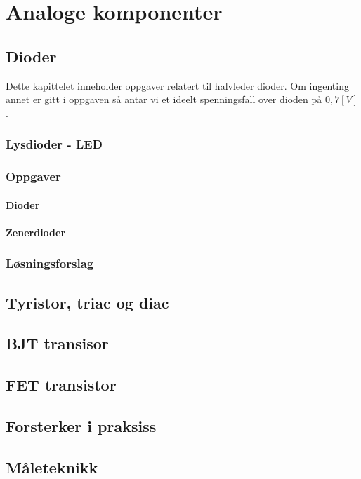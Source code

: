\documentclass[12pt]{report}
\begin{document}


\tableofcontents



\chapter{Analoge komponenter}

\section{Dioder}


Dette kapittelet inneholder oppgaver relatert til halvleder dioder. Om ingenting annet er gitt i oppgaven så antar vi et ideelt spenningsfall over dioden på $0,7[V]$.\\
\subsection{Lysdioder - LED}


\subsection{Oppgaver}
\subsubsection{Dioder}

\subsubsection{Zenerdioder}


\subsection{Løsningsforslag}
\printsolutions[section]



\newpage

\section{Tyristor, triac og diac}

\printsolutions[section]

\section{BJT transisor}

\section{FET transistor}

\section{Forsterker i praksiss}

\section{Måleteknikk}

\newpage

\printbibliography%

\appendix

\end{document}
